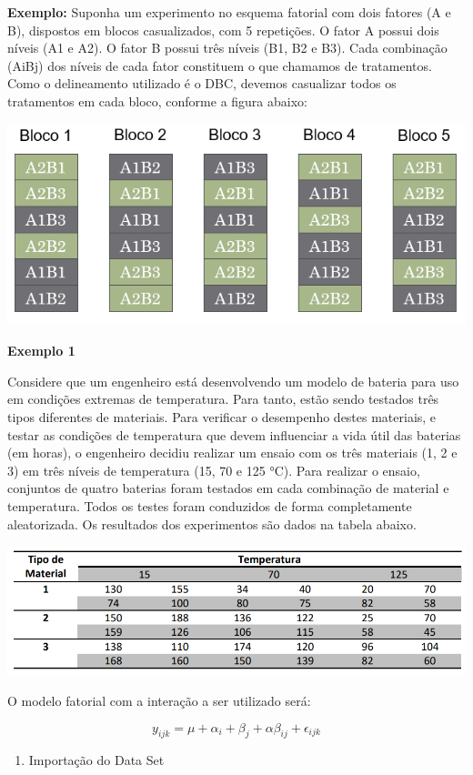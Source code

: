 \documentclass[
]{book}
\providecommand{\tightlist}{%
  \setlength{\itemsep}{0pt}\setlength{\parskip}{0pt}}
\begin{document}
\textbf{Exemplo:} Suponha um experimento no esquema fatorial com dois fatores (A e B), dispostos em blocos casualizados, com 5 repetições. O fator A possui dois níveis (A1 e A2). O fator B possui três níveis (B1, B2 e B3). Cada combinação (AiBj) dos níveis de cada fator constituem o que chamamos de tratamentos. Como o delineamento utilizado é o DBC, devemos casualizar todos os tratamentos em cada bloco, conforme a figura abaixo:

\includegraphics[width=0.7\linewidth]{imagens/f_random}

\textbf{Exemplo 1}

Considere que um engenheiro está desenvolvendo um modelo de bateria para uso em condições extremas de temperatura. Para tanto, estão sendo testados três tipos diferentes de materiais. Para verificar o desempenho destes materiais, e testar as condições de temperatura que devem influenciar a vida útil das baterias (em horas), o engenheiro decidiu realizar um ensaio com os três materiais (1, 2 e 3) em três níveis de temperatura (15, 70 e 125 °C). Para realizar o ensaio, conjuntos de quatro baterias foram testados em cada combinação de material e temperatura. Todos os testes foram conduzidos de forma completamente aleatorizada. Os resultados dos experimentos são dados na tabela abaixo.

\includegraphics[width=0.7\linewidth]{imagens/f_tab_ex1}

O modelo fatorial com a interação a ser utilizado será:

\[ y_{ijk}=\mu +\alpha _{i}+\beta _{j}+\alpha \beta_{ij}+\epsilon _{ijk}\]

\begin{enumerate}
\def\labelenumi{\arabic{enumi}.}
\tightlist
\item
  Importação do Data Set
\end{enumerate}
\end{document}
